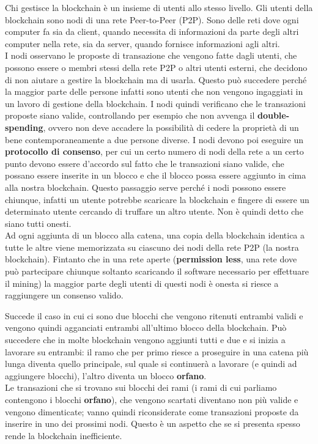 Chi gestisce la blockchain è un insieme di utenti allo stesso livello. Gli utenti della blockchain sono nodi di una rete Peer-to-Peer (P2P). Sono delle reti dove ogni computer fa sia da client, quando necessita di informazioni da parte degli altri computer nella rete, sia da server, quando fornisce informazioni agli altri. \\
I nodi osservano le proposte di transazione che vengono fatte dagli utenti, che possono essere o membri stessi della rete P2P o altri utenti esterni, che decidono di non aiutare a gestire la blockchain ma di usarla. Questo può succedere perché la maggior parte delle persone infatti sono utenti che non vengono ingaggiati in un lavoro di gestione della blockchain. 
I nodi quindi verificano che le transazioni proposte siano valide, controllando per esempio che non avvenga il \textbf{double-spending}, ovvero non deve accadere la possibilità di cedere la proprietà di un bene contemporaneamente a due persone diverse.
I nodi devono poi eseguire un \textbf{protocollo di consenso}, per cui un certo numero di nodi della rete a un certo punto devono essere d’accordo sul fatto che le transazioni siano valide, che possano essere inserite in un blocco e che il blocco possa essere aggiunto in cima alla nostra blockchain. Questo passaggio serve perché i nodi possono essere chiunque, infatti un utente potrebbe scaricare la blockchain e fingere di essere un determinato utente cercando di truffare un altro utente. Non è quindi detto che siano tutti onesti. \\

Ad ogni aggiunta di un blocco alla catena, una copia della blockchain identica a tutte le altre viene memorizzata su ciascuno dei nodi della rete P2P (la nostra blockchain).
Fintanto che in una rete aperte (\textbf{permission less}, una rete dove può partecipare chiunque soltanto scaricando il software necessario per effettuare il mining) la maggior parte degli utenti di questi nodi è onesta si riesce a raggiungere un consenso valido. 

Succede il caso in cui ci sono due blocchi che vengono ritenuti entrambi validi e vengono quindi agganciati entrambi all’ultimo blocco della blockchain. Può succedere che in molte blockchain vengono aggiunti tutti e due e si inizia a lavorare su entrambi: il ramo che per primo riesce a proseguire in una catena più lunga diventa quello principale, sul quale si continuerà a lavorare (e quindi ad aggiungere blocchi), l’altro diventa un blocco \textbf{orfano}. \\
Le transazioni che si trovano sui blocchi dei rami (i rami di cui parliamo contengono i blocchi \textbf{orfano}), che vengono scartati diventano non più valide e vengono dimenticate; vanno quindi riconsiderate come transazioni proposte da inserire in uno dei prossimi nodi. Questo è un aspetto che se si presenta spesso rende la blockchain inefficiente.

